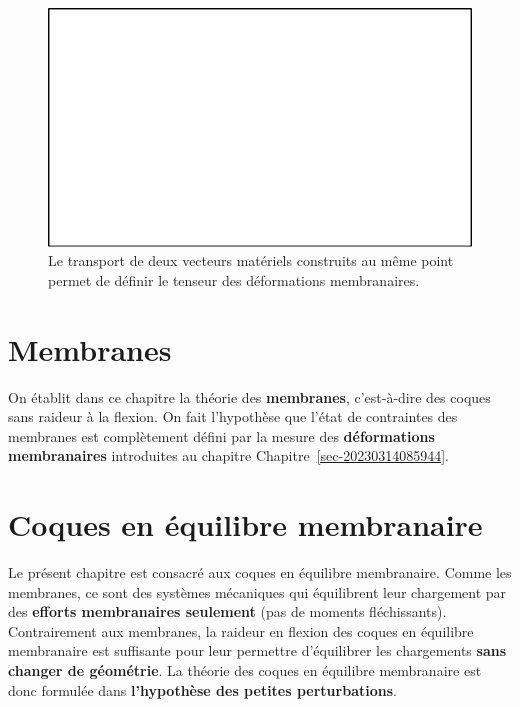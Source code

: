 \documentclass[
  a4paper,
  DIV=11,
  numbers=noendperiod]{scrreprt}
\begin{document}
\begin{figure}

{\centering \includegraphics{croquis/blanc.pdf}

}

\caption{\label{fig-20230302055151}Le transport de deux vecteurs
matériels construits au même point permet de définir le tenseur des
déformations membranaires.}

\end{figure}


\hypertarget{sec-20230328142259}{%
\chapter{Membranes}\label{sec-20230328142259}}

On établit dans ce chapitre la théorie des \textbf{membranes},
c'est-à-dire des coques sans raideur à la flexion. On fait l'hypothèse
que l'état de contraintes des membranes est complètement défini par la
mesure des \textbf{déformations membranaires} introduites au chapitre
Chapitre~\ref{sec-20230314085944}.


\hypertarget{coques-en-uxe9quilibre-membranaire}{%
\chapter{Coques en équilibre
membranaire}\label{coques-en-uxe9quilibre-membranaire}}

Le présent chapitre est consacré aux coques en équilibre membranaire.
Comme les membranes, ce sont des systèmes mécaniques qui équilibrent
leur chargement par des \textbf{efforts membranaires seulement} (pas de
moments fléchissants). Contrairement aux membranes, la raideur en
flexion des coques en équilibre membranaire est suffisante pour leur
permettre d'équilibrer les chargements \textbf{sans changer de
géométrie}. La théorie des coques en équilibre membranaire est donc
formulée dans \textbf{l'hypothèse des petites perturbations}.
\end{document}
